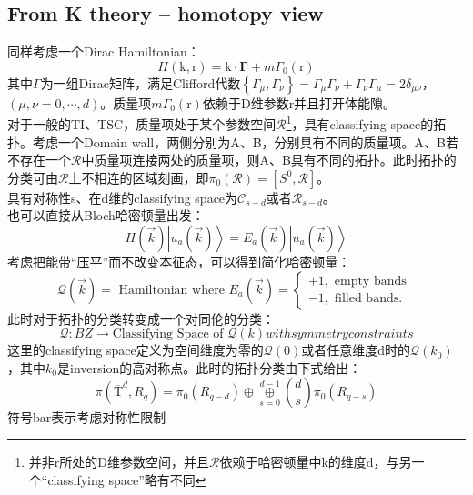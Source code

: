 \documentclass[10pt,openany]{book}
\theoremstyle{thmstyle} %
\theoremstyle{defstyle} %
\theoremstyle{prostyle} %
\begin{document}
\subsection{From K theory -- homotopy view}
同样考虑一个Dirac Hamiltonian：
\begin{equation}
  H(\mathrm{k}, \mathrm{r})=\mathrm{k} \cdot \boldsymbol{\Gamma}+m \Gamma_0(\mathrm{r})
\end{equation}
其中$ \Gamma $为一组Dirac矩阵，满足Clifford代数$ \left\{\Gamma_\mu, \Gamma_\nu\right\}=\Gamma_\mu \Gamma_\nu+\Gamma_\nu \Gamma_\mu=2 \delta_{\mu \nu} $，$ (\mu, \nu=0, \cdots, d) $。质量项$ m \Gamma_0(\mathrm{r}) $依赖于D维参数r并且打开体能隙。\\
对于一般的TI、TSC，质量项处于某个参数空间$ \mathcal{R} $\footnote{并非r所处的D维参数空间，并且$ \mathcal{R} $依赖于哈密顿量中k的维度d，与另一个“classifying space”略有不同}，具有classifying space的拓扑。考虑一个Domain wall，两侧分别为A、B，分别具有不同的质量项。A、B若不存在一个$ \mathcal{R} $中质量项连接两处的质量项，则A、B具有不同的拓扑。此时拓扑的分类可由$ \mathcal{R} $上不相连的区域刻画，即$ \pi_0(\mathcal{R})=\left[S^0, \mathcal{R}\right] $。\\
具有对称性s、在d维的classifying space为$ \mathcal{C}_{s-d} $或者$ \mathcal{R}_{s-d} $。\\
也可以直接从Bloch哈密顿量出发：
\begin{equation}
  H(\vec{k})\left|u_a(\vec{k})\right\rangle=E_a(\vec{k})\left|u_a(\vec{k})\right\rangle
\end{equation}   
考虑把能带“压平”而不改变本征态，可以得到简化哈密顿量：
\begin{equation}
  \mathcal{Q}(\vec{k})=\text { Hamiltonian where } E_a(\vec{k})=\left\{\begin{array}{l}
    +1, \text { empty bands } \\
    -1, \text { filled bands. }
    \end{array}\right.
\end{equation}
此时对于拓扑的分类转变成一个对同伦的分类：
\begin{equation}
  \mathcal{Q}: B Z \rightarrow \text{Classifying Space of }\mathcal{Q}(k) with symmetry constraints
\end{equation}
这里的classifying space定义为空间维度为零的$ \mathcal{Q}(0) $或者任意维度d时的$ \mathcal{Q}(k_0) $，其中$ k_0 $是inversion的高对称点。此时的拓扑分类由下式给出：
\begin{equation}
  \pi\left(\overline{\mathrm{T}}^d, R_q\right)=\pi_0\left(R_{q-d}\right) \oplus \underset{s=0}{\stackrel{d-1}{\oplus}}\binom{d}{s} \pi_0\left(R_{q-s}\right)
\end{equation}
符号bar表示考虑对称性限制  
\end{document}
